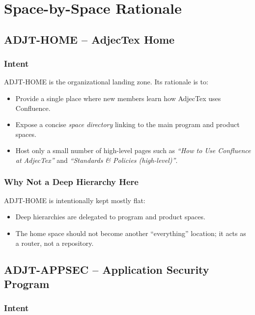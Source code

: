 \documentclass[11pt]{article}
\begin{document}
\section{Space-by-Space Rationale}

\subsection{ADJT-HOME -- AdjecTex Home}

\subsubsection{Intent}

ADJT-HOME is the organizational landing zone. Its rationale is to:

\begin{itemize}[leftmargin=*]
  \item Provide a single place where new members learn how AdjecTex
        uses Confluence.
  \item Expose a concise \emph{space directory} linking to the main
        program and product spaces.
  \item Host only a small number of high-level pages such as
        \emph{``How to Use Confluence at AdjecTex''} and
        \emph{``Standards \& Policies (high-level)''}.
\end{itemize}

\subsubsection{Why Not a Deep Hierarchy Here}

ADJT-HOME is intentionally kept mostly flat:

\begin{itemize}[leftmargin=*]
  \item Deep hierarchies are delegated to program and product spaces.
  \item The home space should not become another ``everything''
        location; it acts as a router, not a repository.
\end{itemize}

\subsection{ADJT-APPSEC -- Application Security Program}

\subsubsection{Intent}
\end{document}
